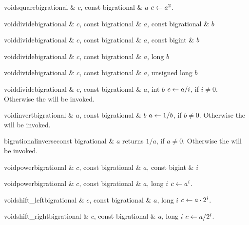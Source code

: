 \begin{fcode}{void}{square}{bigrational & $c$, const bigrational & $a$}
  $c \leftarrow a^2$.
\end{fcode}

\begin{fcode}{void}{divide}{bigrational & $c$, const bigrational & $a$, const bigrational & $b$}\end{fcode}
\begin{fcode}{void}{divide}{bigrational & $c$, const bigrational & $a$, const bigint & $b$}\end{fcode}
\begin{fcode}{void}{divide}{bigrational & $c$, const bigrational & $a$, long $b$}\end{fcode}
\begin{fcode}{void}{divide}{bigrational & $c$, const bigrational & $a$, unsigned long $b$}\end{fcode}
\begin{fcode}{void}{divide}{bigrational & $c$, const bigrational & $a$, int $b$}
  $c \leftarrow a / i$, if $i \neq 0$.  Otherwise the \LEH will be invoked.
\end{fcode}

\begin{fcode}{void}{invert}{bigrational & $a$, const bigrational & $b$}
  $a \leftarrow 1 / b$, if $b \neq 0$.  Otherwise the \LEH will be invoked.
\end{fcode}

\begin{fcode}{bigrational}{inverse}{const bigrational & $a$}
  returns $1 / a$, if $a \neq 0$.  Otherwise the \LEH will be invoked.
\end{fcode}

\begin{fcode}{void}{power}{bigrational & $c$, const bigrational & $a$, const bigint & $i$}\end{fcode}
\begin{fcode}{void}{power}{bigrational & $c$, const bigrational & $a$, long $i$}
  $c \leftarrow a^i$.
\end{fcode}



\SHFT

\begin{fcode}{void}{shift_left}{bigrational & $c$, const bigrational & $a$, long $i$}
  $c \leftarrow a \cdot 2^i$.
\end{fcode}

\begin{fcode}{void}{shift_right}{bigrational & $c$, const bigrational & $a$, long $i$}
  $c \leftarrow a / 2^i$.
\end{fcode}


